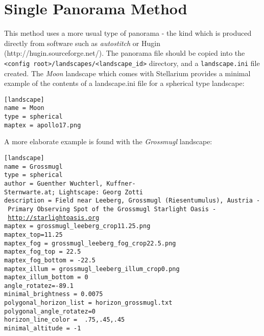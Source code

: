 \section{Single Panorama Method}\label{single-panorama-method}

This method uses a more usual type of panorama - the kind which is
produced directly from software such as \emph{autostitch} or Hugin
(http://hugin.sourceforge.net/). The panorama file should be copied into
the
\texttt{\textless{}config\ root\textgreater{}/landscapes/\textless{}landscape\_id\textgreater{}}
directory, and a \texttt{landscape.ini} file created. The \emph{Moon}
landscape which comes with Stellarium provides a minimal example of the
contents of a landscape.ini file for a spherical type landscape:

\begin{config}
\texttt{{[}landscape{]}}\\
\texttt{name~=~Moon}\\
\texttt{type~=~spherical}\\
\texttt{maptex~=~apollo17.png}
\end{config}

A more elaborate example is found with the \emph{Grossmugl} landscape:

\begin{config}
\texttt{{[}landscape{]}}\\
\texttt{name~=~Grossmugl}\\
\texttt{type~=~spherical}\\
\texttt{author~=~Guenther~Wuchterl,~Kuffner-Sternwarte.at;~Lightscape:~Georg~Zotti}\\
\texttt{description~=~Field~near~Leeberg,~Grossmugl~(Riesentumulus),~Austria~-~Primary~Observing~Spot~of~the~Grossmugl~Starlight~Oasis~-~}\href{http://starlightoasis.org}{\texttt{http://starlightoasis.org}}\\
\texttt{maptex~=~grossmugl\_leeberg\_crop11.25.png}\\
\texttt{maptex\_top=11.25~}\\
\texttt{maptex\_fog~=~grossmugl\_leeberg\_fog\_crop22.5.png}\\
\texttt{maptex\_fog\_top~=~22.5}\\
\texttt{maptex\_fog\_bottom~=~-22.5}\\
\texttt{maptex\_illum~=~grossmugl\_leeberg\_illum\_crop0.png}\\
\texttt{maptex\_illum\_bottom~=~0}\\
\texttt{angle\_rotatez=-89.1}\\
\texttt{minimal\_brightness~=~0.0075}\\
\texttt{polygonal\_horizon\_list~=~horizon\_grossmugl.txt}\\
\texttt{polygonal\_angle\_rotatez=0}\\
\texttt{horizon\_line\_color~=~~.75,.45,.45}\\
\texttt{minimal\_altitude~=~-1}
\end{config}

